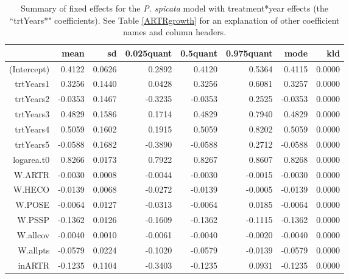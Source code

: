 \documentclass[11pt]{article}
\begin{document}
\begin{table}
\centering
\caption{Summary of fixed effects for the \textit{P. spicata} model with treatment*year effects (the ``trtYears*" coefficients). See Table \ref{ARTRgrowth} for an explanation of other coefficient names and column headers.} 
\label{table:PSSPgrowth-trtYears}
\begin{tabular}{rrrrrrrr}
  \hline
 & mean & sd & 0.025quant & 0.5quant & 0.975quant & mode & kld \\ 
  \hline
(Intercept) & 0.4122 & 0.0626 & 0.2892 & 0.4120 & 0.5364 & 0.4115 & 0.0000 \\ 
  trtYears1 & 0.3256 & 0.1440 & 0.0428 & 0.3256 & 0.6081 & 0.3257 & 0.0000 \\ 
  trtYears2 & -0.0353 & 0.1467 & -0.3235 & -0.0353 & 0.2525 & -0.0353 & 0.0000 \\ 
  trtYears3 & 0.4829 & 0.1586 & 0.1714 & 0.4829 & 0.7940 & 0.4829 & 0.0000 \\ 
  trtYears4 & 0.5059 & 0.1602 & 0.1915 & 0.5059 & 0.8202 & 0.5059 & 0.0000 \\ 
  trtYears5 & -0.0588 & 0.1682 & -0.3890 & -0.0588 & 0.2712 & -0.0588 & 0.0000 \\ 
  logarea.t0 & 0.8266 & 0.0173 & 0.7922 & 0.8267 & 0.8607 & 0.8268 & 0.0000 \\ 
  W.ARTR & -0.0030 & 0.0008 & -0.0044 & -0.0030 & -0.0015 & -0.0030 & 0.0000 \\ 
  W.HECO & -0.0139 & 0.0068 & -0.0272 & -0.0139 & -0.0005 & -0.0139 & 0.0000 \\ 
  W.POSE & -0.0064 & 0.0127 & -0.0313 & -0.0064 & 0.0185 & -0.0064 & 0.0000 \\ 
  W.PSSP & -0.1362 & 0.0126 & -0.1609 & -0.1362 & -0.1115 & -0.1362 & 0.0000 \\ 
  W.allcov & -0.0040 & 0.0010 & -0.0061 & -0.0040 & -0.0020 & -0.0040 & 0.0000 \\ 
  W.allpts & -0.0579 & 0.0224 & -0.1020 & -0.0579 & -0.0139 & -0.0579 & 0.0000 \\ 
  inARTR & -0.1235 & 0.1104 & -0.3403 & -0.1235 & 0.0931 & -0.1235 & 0.0000 \\ 
   \hline
\end{tabular}
\end{table}
\end{document}

